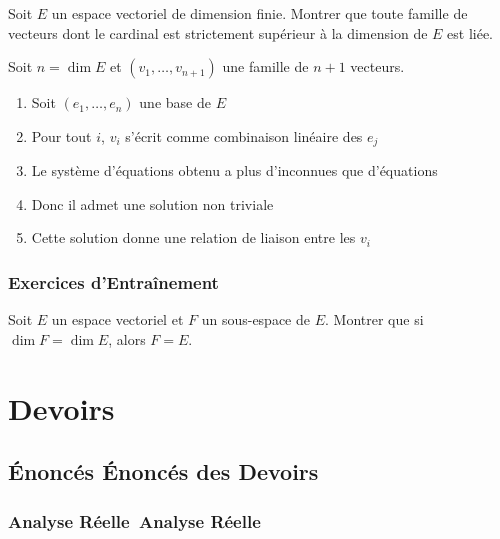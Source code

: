 \documentclass[11pt,%
	fleqn,%
	a4paper,%
	twoside%
]{backagBook}
\def\faClipboardCheck{Énoncés}%
\def\faCalculator{Analyse Réelle}%
\begin{document}
\begin{exercise}
Soit $E$ un espace vectoriel de dimension finie. Montrer que toute famille de vecteurs dont le cardinal est strictement supérieur à la dimension de $E$ est liée.
\end{exercise}

\begin{solution}
Soit $n = \dim E$ et $(v_1, \ldots, v_{n+1})$ une famille de $n+1$ vecteurs.
\begin{enumerate}
    \item Soit $(e_1, \ldots, e_n)$ une base de $E$
    \item Pour tout $i$, $v_i$ s'écrit comme combinaison linéaire des $e_j$
    \item Le système d'équations obtenu a plus d'inconnues que d'équations
    \item Donc il admet une solution non triviale
    \item Cette solution donne une relation de liaison entre les $v_i$
\end{enumerate}
\end{solution}

\section{Exercices d'Entraînement}

\begin{exercise}
Soit $E$ un espace vectoriel et $F$ un sous-espace de $E$. Montrer que si $\dim F = \dim E$, alors $F = E$.
\end{exercise}


\part{Devoirs}
\chapterspaceabove{6cm}
\chapter{{\faClipboardCheck} Énoncés des Devoirs}

\section{\protect\faCalculator\ Analyse Réelle}
\end{document}

